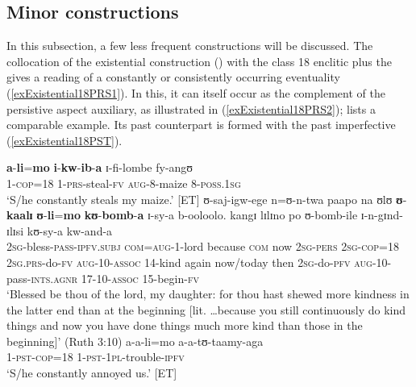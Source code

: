 \subsection{Minor constructions}
\label{MinorConstuctions}In this subsection, a few less frequent constructions will be discussed. The collocation of the existential construction () with the  class 18 enclitic plus the  gives a reading of a constantly or consistently occurring eventuality (\ref{exExistential18PRS1}). In this, it can itself occur as the complement of the persistive aspect auxiliary, as illustrated in (\ref{exExistential18PRS2}); \citet[125]{NurseD1979} lists a comparable example. Its past counterpart is formed with the past imperfective (\ref{exExistential18PST}).

\begin{exe}
\ex \label{exExistential18PRS1}\gll \textbf{a}-\textbf{li}=\textbf{mo} \textbf{i}-\textbf{kw}-\textbf{ib}-\textbf{a} ɪ-fi-lombe fy-angʊ\\
1-\textsc{cop}=18 1-\textsc{prs}-steal-\textsc{fv} \textsc{aug}-8-maize 8-\textsc{poss.1sg}\\
\glt \lq S/he constantly steals my maize.' [ET]
\ex \label{exExistential18PRS2}
\gll ʊ-saj-igw-ege n=ʊ-n-twa paapo na ʊlʊ \textbf{ʊ}-\textbf{kaalɪ} \textbf{ʊ}-\textbf{li}=\textbf{mo} \textbf{kʊ}-\textbf{bomb}-\textbf{a} ɪ-sy-a b-ooloolo. kangɪ lɪlɪno po ʊ-bomb-ile ɪ-n-gɪnd-ɪlɪsi kʊ-sy-a kw-and-a\\
\textsc{2sg}-bless-\textsc{pass}-\textsc{ipfv.subj} \textsc{com}=\textsc{aug}-1-lord because \textsc{com} now \textsc{2sg}-\textsc{pers} \textsc{2sg}-\textsc{cop}=18 \textsc{2sg.prs}-do-\textsc{fv} \textsc{aug}-10-\textsc{assoc} 14-kind again now/today then \textsc{2sg}-do-\textsc{pfv} \textsc{aug}-10-pass-\textsc{ints.agnr} 17-10-\textsc{assoc} 15-begin-\textsc{fv}\\
\glt \lq Blessed be thou of the lord, my daughter: for thou hast shewed more kindness in the latter end than at the beginning [lit. \ldots because you still continuously do kind things and now you have done things much more kind than those in the beginning]' (Ruth 3:10)
\ex \label{exExistential18PST} \gll a-a-li=mo a-a-tʊ-taamy-aga\\
1-\textsc{pst}-\textsc{cop}=18 1-\textsc{pst}-\textsc{1pl}-trouble-\textsc{ipfv}\\
\glt \lq S/he constantly annoyed us.' [ET]
\end{exe}

